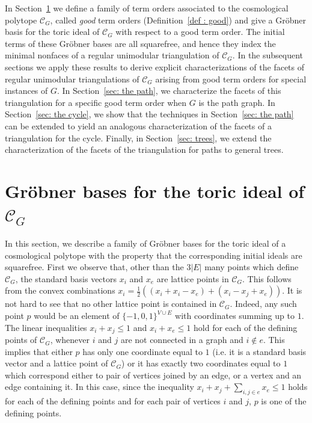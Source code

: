 \documentclass[11pt]{article}
\theoremstyle{definition}
\numberwithin{equation}{section}
\begin{document}
In Section~\ref{sec: grobner basis} we define a family of term orders associated to the cosmological polytope $\mathcal{C}_G$, called \emph{good} term orders (Definition~\ref{def : good}) and give a Gr\"obner basis for the toric ideal of $\mathcal{C}_G$ with respect to a good term order. 
The initial terms of these Gröbner bases are all squarefree, and hence they index the minimal nonfaces of a regular unimodular triangulation of $\mathcal{C}_G$.
In the subsequent sections we apply these results to derive explicit characterizations of the facets of regular unimodular triangulations of $\mathcal{C}_G$ arising from good term orders for special instances of $G$. 
In Section~\ref{sec: the path}, we characterize the facets of this triangulation for a specific good term order when $G$ is the path graph. 
In Section~\ref{sec: the cycle}, we show that the techniques in Section~\ref{sec: the path} can be extended to yield an analogous characterization of the facets of a triangulation for the cycle. 
Finally, in Section~\ref{sec: trees}, we extend the characterization of the facets of the triangulation for paths to general trees. 

\section{Gr\"obner bases for the toric ideal of \texorpdfstring{$\mathcal{C}_G$}{C\_G}}
\label{sec: grobner basis}
In this section, we describe a family of Gr\"{o}bner bases for the toric ideal of a cosmological polytope with the property that the corresponding initial ideals are squarefree. 
First we observe that, other than the $3|E|$ many points which define $\mathcal{C}_G$, the standard basis vectors $x_i$ and $x_e$ are lattice points in $\mathcal{C}_G$. This follows from the convex combinations $x_i=\frac{1}{2}((x_i+x_i-x_e)+(x_i-x_j+x_e))$. 
It is not hard to see that no other lattice point is contained in $\mathcal{C}_G$. Indeed, any such point $p$ would be an element of $\{-1,0,1\}^{V\cup E}$ with coordinates summing up to $1$. The linear inequalities $x_i+x_j\leq 1$ and $x_i+x_e\leq 1$ hold for each of the defining points of $\mathcal{C}_G$, whenever $i$ and $j$ are not connected in a graph and $i\notin e$. This implies that either $p$ has only one coordinate equal to $1$ (i.e. it is a standard basis vector and a lattice point of $\mathcal{C}_G$) or it has exactly two coordinates equal to $1$ which correspond either to pair of vertices joined by an edge, or a vertex and an edge containing it. In this case, since the inequality $x_i+x_j+\sum_{i,j\in e}x_e\leq 1$ holds for each of the defining points and for each pair of vertices $i$ and $j$, $p$ is one of the defining points.
\end{document}
